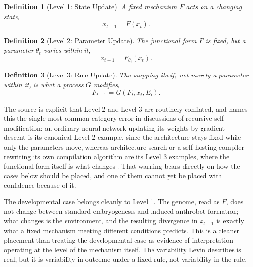 \documentclass[11pt]{article}
\newtheorem{definition}{Definition}[section]
\begin{document}
\begin{definition}[Level 1: State Update]
A fixed mechanism $F$ acts on a changing state,
\[
x_{t+1} = F(x_t).
\]
\end{definition}

\begin{definition}[Level 2: Parameter Update]
The functional form $F$ is fixed, but a parameter $\theta_t$ varies within it,
\[
x_{t+1} = F_{\theta_t}(x_t).
\]
\end{definition}

\begin{definition}[Level 3: Rule Update]
The mapping itself, not merely a parameter within it, is what a process $G$ modifies,
\[
F_{t+1} = G(F_t, x_t, E_t).
\]
\end{definition}

The source is explicit that Level 2 and Level 3 are routinely conflated, and names this the single most common category error in discussions of recursive self-modification: an ordinary neural network updating its weights by gradient descent is its canonical Level 2 example, since the architecture stays fixed while only the parameters move, whereas architecture search or a self-hosting compiler rewriting its own compilation algorithm are its Level 3 examples, where the functional form itself is what changes \cite{recursivecontinuation}. That warning bears directly on how the cases below should be placed, and one of them cannot yet be placed with confidence because of it.

The developmental case belongs cleanly to Level 1. The genome, read as $F$, does not change between standard embryogenesis and induced anthrobot formation; what changes is the environment, and the resulting divergence in $x_{t+1}$ is exactly what a fixed mechanism meeting different conditions predicts. This is a cleaner placement than treating the developmental case as evidence of interpretation operating at the level of the mechanism itself. The variability Levin describes is real, but it is variability in outcome under a fixed rule, not variability in the rule.
\end{document}
